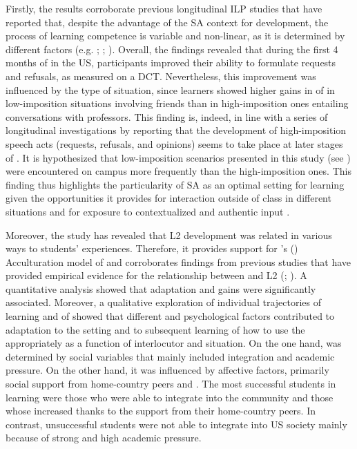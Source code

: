 \documentclass[output=paper]{langsci/langscibook}
\begin{document}
Firstly, the results corroborate previous longitudinal ILP studies that have reported that, despite the advantage of the SA context for  development, the process of learning  competence is variable and non-linear, as it is determined by different factors (e.g. \citealt{Barron2003}; \citealt{Félix-Brasdefer2004}; \citealt{TaguchiRoever2017}). Overall, the findings revealed that during the first 4 months of  in the US, participants improved their ability to formulate requests and refusals, as measured on a DCT. Nevertheless, this improvement was influenced by the type of situation, since learners showed higher gains in  of  in low-imposition situations involving friends than in high-imposition ones entailing conversations with professors. This finding is, indeed, in line with a series of longitudinal investigations by \cite{Taguchi2011, Taguchi2013} reporting that the development of high-imposition  speech acts (requests, refusals, and opinions) seems to take place at later stages of  . It is hypothesized that low-imposition scenarios presented in this study (see ) were encountered on campus more frequently than the high-imposition ones. This finding thus highlights the particularity of SA as an optimal setting for  learning given the opportunities it provides for interaction outside of class in different situations and for exposure to contextualized and authentic input \citep{Taguchi2015contextually}.

 
Moreover, the study has revealed that L2  development was related in various ways to students’  experiences. Therefore, it provides support for \citeauthor{Schumann1978}'s (\citeyear*{Schumann1978,Schumann1986}) Acculturation model of   and corroborates findings from previous studies that have provided empirical evidence for the relationship between  and L2  (\citealt{Schmidt1983}; \citealt{DörnyeiEtAl2004}). A quantitative analysis showed that  adaptation and  gains were significantly associated. Moreover, a qualitative exploration of individual trajectories of  learning and of  showed that different  and psychological factors contributed to adaptation to the  setting and to subsequent learning of how to use the  appropriately as a function of interlocutor and situation. On the one hand,  was determined by social variables that mainly included integration and academic pressure. On the other hand, it was influenced by affective factors, primarily social support from home-country peers and . The most successful students in  learning were those who were able to integrate into the  community and those whose  increased thanks to the support from their home-country peers. In contrast, unsuccessful students were not able to integrate into US society mainly because of strong  and high academic pressure. 
\end{document}
